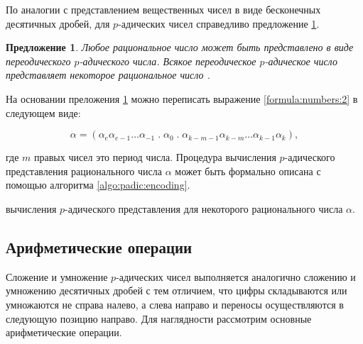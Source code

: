 \documentclass[master, och, diploma, times]{sty/SCWorks}
\theoremstyle{plain}
\newtheorem{proposition}{Предложение}[section]
\theoremstyle{definition}
\numberwithin{equation}{section}
\begin{document}
По аналогии с представлением вещественных чисел в виде бесконечных десятичных дробей, для $p$-адических чисел справедливо предложение \ref{pros:numbers:1}.

\begin{proposition}\label{pros:numbers:1}
Любое рациональное число может быть представлено в виде переодического $p$-адического числа. Всякое переодическое $p$-адическое число представляет некоторое рациональное число \cite{bib:analysis:kobliz}.
\end{proposition}

На основании преложения \ref{pros:numbers:1} можно переписать выражение \ref{formula:numbers:2} в следующем виде:

\begin{equation}\label{formula:numbers:3}
\alpha=(\alpha_{e}\alpha_{e-1}\dots\alpha_{-1} \; . \; \alpha_0\;.\;\alpha_{k-m-1}\alpha_{k-m}\dots\alpha_{k-1}\alpha_{k}),
\end{equation}

\noindent где $m$ правых чисел это период числа. Процедура вычисления $p$-адического представления рационального числа $\alpha$ может быть формально описана с помощью алгоритма \ref{algo:padic:encoding}.

\begin{algorithm}
\DontPrintSemicolon %
\caption{вычисления $p$-адического представления для некоторого рационального числа $\alpha$.}
\label{algo:padic:encoding}
\end{algorithm}


\subsection{Арифметические операции}

Сложение и умножение $p$-адических чисел выполняется аналогично сложению и умножению десятичных дробей с тем отличием, что цифры складываются или умножаются не справа налево, а слева направо и переносы осуществляются в следующую позицию направо. Для наглядности рассмотрим основные арифметические операции.
\end{document}
